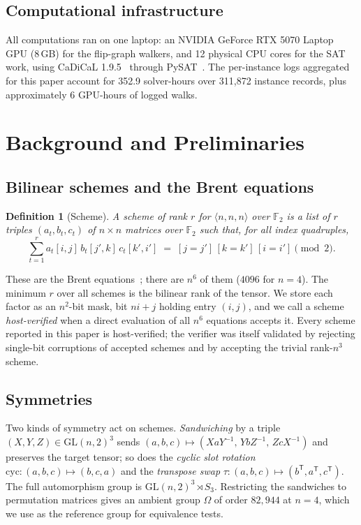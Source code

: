 \documentclass[11pt]{article}
\newtheorem{definition}{Definition}
\newcommand{\FF}{\mathbb{F}_2}
\newcommand{\tw}[3]{\langle #1,#2,#3\rangle}
\newcommand{\GL}{\mathrm{GL}}
\begin{document}
\subsection{Computational infrastructure}

All computations ran on one laptop: an NVIDIA GeForce RTX 5070 Laptop GPU (8\,GB) for the flip-graph
walkers, and 12 physical CPU cores for the SAT work, using CaDiCaL 1.9.5~\cite{cadical} through
PySAT~\cite{pysat}. The per-instance logs aggregated for this paper account for 352.9 solver-hours over
311{,}872 instance records, plus approximately 6 GPU-hours of logged walks.

\section{Background and Preliminaries}

\subsection{Bilinear schemes and the Brent equations}

\begin{definition}[Scheme]
A \emph{scheme} of rank $r$ for $\tw nnn$ over $\FF$ is a list of $r$ triples $(a_t,b_t,c_t)$ of
$n\times n$ matrices over $\FF$ such that, for all index quadruples,
\begin{equation}
\sum_{t=1}^{r} a_t[i,j]\, b_t[j',k]\, c_t[k',i'] \;=\; [j=j']\,[k=k']\,[i=i'] \pmod 2 .
\label{eq:brent}
\end{equation}
\end{definition}

These are the Brent equations~\cite{Brent1970}; there are $n^6$ of them ($4096$ for $n=4$). The minimum
$r$ over all schemes is the bilinear rank of the tensor. We store each factor as an $n^2$-bit mask, bit
$ni+j$ holding entry $(i,j)$, and we call a scheme \emph{host-verified} when a direct evaluation of
all $n^6$ equations accepts it. Every scheme reported in this paper is host-verified; the verifier was
itself validated by rejecting single-bit corruptions of accepted schemes and by accepting the trivial
rank-$n^3$ scheme.

\subsection{Symmetries}

Two kinds of symmetry act on schemes. \emph{Sandwiching} by a triple $(X,Y,Z)\in\GL(n,2)^3$ sends
$(a,b,c)\mapsto (XaY^{-1},\,YbZ^{-1},\,ZcX^{-1})$ and preserves the target tensor; so does the
\emph{cyclic slot rotation} $\mathrm{cyc}:(a,b,c)\mapsto(b,c,a)$ and the \emph{transpose swap}
$\tau:(a,b,c)\mapsto(b^{\mathsf T},a^{\mathsf T},c^{\mathsf T})$. The full automorphism group is
$\GL(n,2)^3\rtimes S_3$. Restricting the sandwiches to permutation matrices gives an ambient group
$\Omega$ of order $82{,}944$ at $n=4$, which we use as the reference group for equivalence tests.
\end{document}
